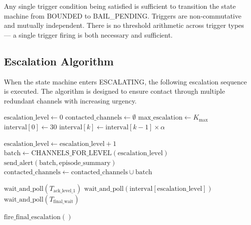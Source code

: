 \bigskip

Any single trigger condition being satisfied is sufficient to transition the state machine from BOUNDED to BAIL\_PENDING. Triggers are non-commutative and mutually independent. There is no threshold arithmetic across trigger types — a single trigger firing is both necessary and sufficient.

\bigskip

\subsection{Escalation Algorithm}
\label{sec:escalation}

When the state machine enters ESCALATING, the following escalation sequence is executed. The algorithm is designed to ensure contact through multiple redundant channels with increasing urgency.

\bigskip

\begin{algorithm}
\caption{Escalation Sequence}
\begin{algorithmic}[1]
\State $\text{escalation\_level} \gets 0$
\State $\text{contacted\_channels} \gets \emptyset$
\State $\text{max\_escalation} \gets K_{\text{max}}$ 
\State $\text{interval}[0] \gets 30$ 
\State $\text{interval}[k] \gets \text{interval}[k-1] \times \alpha$ 

    \State $\text{escalation\_level} \gets \text{escalation\_level} + 1$
    \State $\text{batch} \gets \text{CHANNELS\_FOR\_LEVEL}(\text{escalation\_level})$
    \State $\text{send\_alert}(\text{batch}, \text{episode\_summary})$
    \State $\text{contacted\_channels} \gets \text{contacted\_channels} \cup \text{batch}$

        \State $\text{wait\_and\_poll}(T_{\text{ack\_level\_1}})$
        \State $\text{wait\_and\_poll}(\text{interval}[\text{escalation\_level}])$
    \Else
        \State $\text{wait\_and\_poll}(T_{\text{final\_wait}})$
    \EndIf

        \State \Return {}
    \EndIf
\EndWhile

    \State $\text{fire\_final\_escalation}()$
    \State \Return {}
\EndIf
\end{algorithmic}
\end{algorithm}


